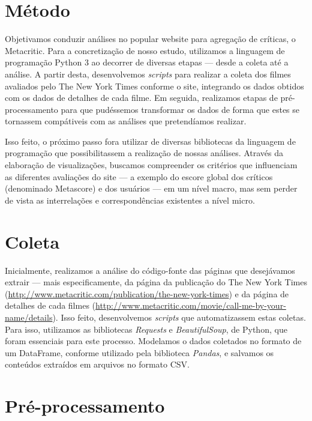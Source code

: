 \documentclass[review]{elsarticle}
\begin{document}
\section{Método}

Objetivamos conduzir análises no popular website para agregação de críticas, o Metacritic. Para a concretização de nosso estudo, utilizamos a linguagem de programação Python 3 ao decorrer de diversas etapas — desde a coleta até a análise. A partir desta, desenvolvemos \textit{scripts} para realizar a coleta dos filmes avaliados pelo The New York Times conforme o site, integrando os dados obtidos com os dados de detalhes de cada filme. Em seguida, realizamos etapas de pré-processamento para que pudéssemos transformar os dados de forma que estes se tornassem compátiveis com as análises que pretendíamos realizar.

Isso feito, o próximo passo fora utilizar de diversas bibliotecas da linguagem de programação que possibilitassem a realização de nossas análises. Através da elaboração de visualizações, buscamos compreender os critérios que influenciam as diferentes avaliações do site — a exemplo do escore global dos críticos (denominado Metascore) e dos usuários — em um nível macro, mas sem perder de vista as interrelações e correspondências existentes a nível micro.

\section{Coleta}

Inicialmente, realizamos a análise do código-fonte das páginas que desejávamos extrair — mais especificamente, da página da publicação do The New York Times (\url{http://www.metacritic.com/publication/the-new-york-times}) e da página de detalhes de cada filmes (\url{http://www.metacritic.com/movie/call-me-by-your-name/details}). Isso feito, desenvolvemos \textit{scripts} que automatizassem estas coletas. Para isso, utilizamos as bibliotecas \textit{Requests} e \textit{BeautifulSoup}, de Python, que foram essenciais para este processo. Modelamos o dados coletados no formato de um DataFrame, conforme utilizado pela biblioteca \textit{Pandas}, e salvamos os conteúdos extraídos em arquivos no formato CSV.

\section{Pré-processamento}
\end{document}

